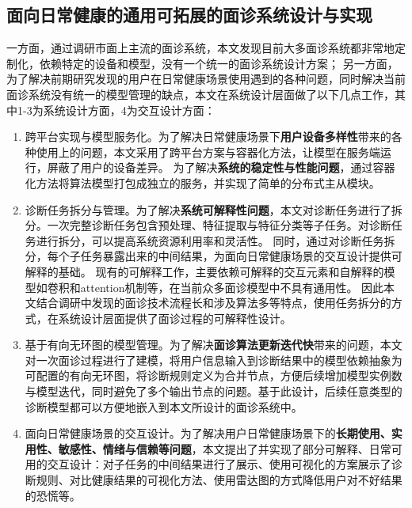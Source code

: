 \subsection{面向日常健康的通用可拓展的面诊系统设计与实现}
一方面，通过调研市面上主流的面诊系统，本文发现目前大多面诊系统都非常地定制化，依赖特定的设备和模型，没有一个统一的面诊系统设计方案；
另一方面，为了解决前期研究发现的用户在日常健康场景使用遇到的各种问题，同时解决当前面诊系统没有统一的模型管理的缺点，本文在系统设计层面做了以下几点工作，其中1-3为系统设计方面，4为交互设计方面：
\begin{enumerate}
\item 跨平台实现与模型服务化。为了解决日常健康场景下\textbf{用户设备多样性}带来的各种使用上的问题，本文采用了跨平台方案与容器化方法，让模型在服务端运行，屏蔽了用户的设备差异。
    为了解决\textbf{系统的稳定性与性能问题}，通过容器化方法将算法模型打包成独立的服务，并实现了简单的分布式主从模块。

    \item 诊断任务拆分与管理。为了解决\textbf{系统可解释性问题}，本文对诊断任务进行了拆分。一次完整诊断任务包含预处理、特征提取与特征分类等子任务。对诊断任务进行拆分，可以提高系统资源利用率和灵活性。
    同时，通过对诊断任务拆分，每个子任务暴露出来的中间结果，为面向日常健康场景的交互设计提供可解释的基础。
    现有的可解释工作，主要依赖可解释的交互元素和自解释的模型如卷积和attention机制等\cite{abdul2018trends}，在当前众多面诊模型中不具有通用性。
    因此本文结合调研中发现的面诊技术流程长和涉及算法多等特点，使用任务拆分的方式，在系统设计层面提供了面诊过程的可解释性设计。

    \item 基于有向无环图的模型管理。为了解决\textbf{面诊算法更新迭代快}带来的问题，本文对一次面诊过程进行了建模，将用户信息输入到诊断结果中的模型依赖抽象为可配置的有向无环图，将诊断规则定义为合并节点，方便后续增加模型实例数与模型迭代，同时避免了多个输出节点的问题。基于此设计，后续任意类型的诊断模型都可以方便地嵌入到本文所设计的面诊系统中。
    
    \item 面向日常健康场景的交互设计。为了解决用户日常健康场景下的\textbf{长期使用、实用性、敏感性、情绪与信赖等问题}，本文提出了并实现了部分可解释、日常可用的交互设计：对子任务的中间结果进行了展示、使用可视化的方案展示了诊断规则、对比健康结果的可视化方法、使用雷达图的方式降低用户对不好结果的恐慌等。
\end{enumerate}

